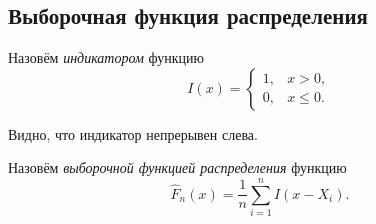 \subsection{Выборочная функция распределения}
\begin{definition}
	Назовём \emph{индикатором} функцию
\[
	I(x) = \begin{cases}1, &x>0,\\
	0, &x\leqslant 0.\end{cases}
\]
\end{definition}
Видно, что индикатор непрерывен слева.

\begin{definition}
	Назовём \emph{выборочной функцией распределения} функцию
	\[
		\widehat F_n (x) = \frac{1}{n} \sum_{i=1}^n I(x-X_i).
	\]
\end{definition}


